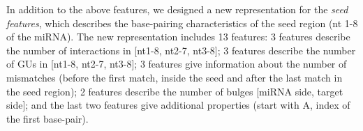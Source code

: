 In addition to the above features, we designed a new representation for the \textit{seed features}, which describes the base-pairing characteristics of the seed region (nt 1-8 of the miRNA). The new representation includes 13 features: 3 features describe the number of interactions in [nt1-8, nt2-7, nt3-8]; 3 features describe the number of GUs in [nt1-8, nt2-7, nt3-8]; 3 features give information about the number of mismatches (before the first match, inside the seed and after the last match in the seed region); 2 features describe the number of bulges [miRNA side, target side]; and the last two features give additional properties (start with A, index of the first base-pair).



\begin{table}[h!]
\caption{Feature categories that are used to represent miRNA-target interactions}
\label{tbl:feature_category}
\end{table}
